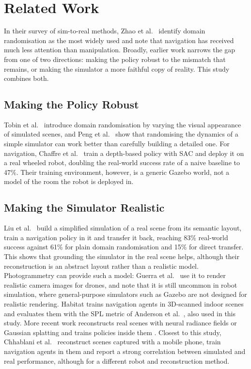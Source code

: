 \section{Related Work}\label{sec:related}
In their survey of sim-to-real methods, Zhao et al.\ \cite{zhao2020sim} identify domain
randomisation as the most widely used and note that navigation has received much less attention
than manipulation. Broadly, earlier work narrows the gap from one of two directions: making the
policy robust to the mismatch that remains, or making the simulator a more faithful copy of
reality. This study combines both.

\subsection{Making the Policy Robust}
Tobin et al.\ \cite{tobin2017domain} introduce domain randomisation by varying the visual
appearance of simulated scenes, and Peng et al.\ \cite{peng2018dynamics} show that randomising
the dynamics of a simple simulator can work better than carefully building a detailed one. For
navigation, Chaffre et al.\ \cite{chaffre2020sim} train a depth-based policy with SAC and
deploy it on a real wheeled robot, doubling the real-world success rate of a naive baseline to
47\%. Their training environment, however, is a generic Gazebo world, not a model of the room
the robot is deployed in.

\subsection{Making the Simulator Realistic}
Liu et al.\ \cite{liu2020rsr} build a simplified simulation of a real scene from its semantic
layout, train a navigation policy in it and transfer it back, reaching 83\% real-world
success against 61\% for plain domain randomisation and 15\% for direct transfer. This shows
that grounding the simulator in the real scene helps, although their reconstruction is an
abstract layout rather than a realistic model. Photogrammetry can provide such a model: Guerra et
al.\ \cite{guerra2019flightgoggles} use it to render realistic camera images for drones, and
note that it is still uncommon in robot simulation, where general-purpose simulators such as
Gazebo \cite{koenig2004gazebo} are not designed for realistic rendering. Habitat
\cite{savva2019habitat} trains navigation agents in 3D-scanned indoor scenes and evaluates them
with the SPL metric of Anderson et al.\ \cite{anderson2018evaluation}, also used in this study.
More recent work reconstructs real scenes with neural radiance fields or Gaussian splatting and
trains policies inside them \cite{byravan2022nerf2real, shen2024driveenv,
chhablani2025embodiedsplat}. Closest to this study, Chhablani et al.\
\cite{chhablani2025embodiedsplat} reconstruct scenes captured with a mobile phone, train
navigation agents in them and report a strong correlation between simulated and real
performance, although for a different robot and reconstruction method.

